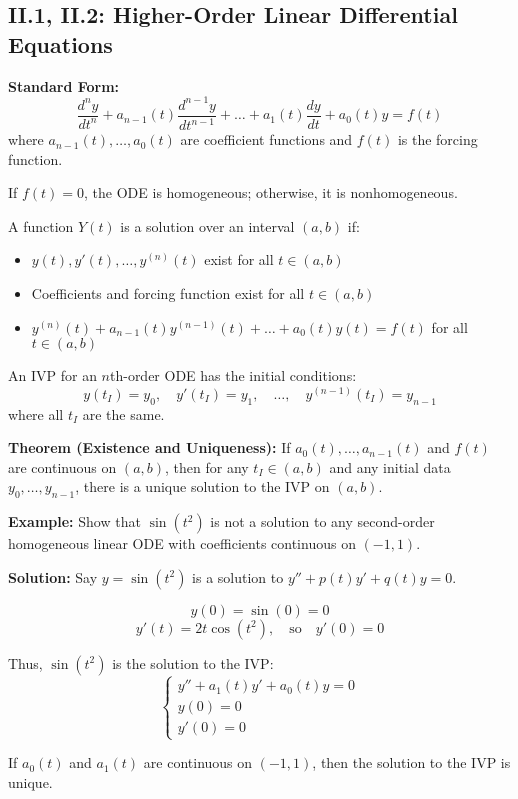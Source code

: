 \documentclass{article}
\begin{document}
\subsection*{II.1, II.2: Higher-Order Linear Differential Equations}

\textbf{Standard Form:}
\[
\frac{d^n y}{dt^n} + a_{n-1}(t) \frac{d^{n-1} y}{dt^{n-1}} + \dots + a_1(t) \frac{dy}{dt} + a_0(t)y = f(t)
\]
where \(a_{n-1}(t), \dots, a_0(t)\) are coefficient functions and \(f(t)\) is the forcing function.

If \(f(t) = 0\), the ODE is homogeneous; otherwise, it is nonhomogeneous.

A function \(Y(t)\) is a solution over an interval \((a, b)\) if:
\begin{itemize}
    \item \(y(t), y'(t), \dots, y^{(n)}(t)\) exist for all \(t \in (a, b)\)
    \item Coefficients and forcing function exist for all \(t \in (a, b)\)
    \item \(y^{(n)}(t) + a_{n-1}(t) y^{(n-1)}(t) + \dots + a_0(t)y(t) = f(t)\) for all \(t \in (a, b)\)
\end{itemize}

An IVP for an \(n\)th-order ODE has the initial conditions:
\[
y(t_I) = y_0, \quad y'(t_I) = y_1, \quad \dots, \quad y^{(n-1)}(t_I) = y_{n-1}
\]
where all \(t_I\) are the same.

\textbf{Theorem (Existence and Uniqueness):}  
If \(a_0(t), \dots, a_{n-1}(t)\) and \(f(t)\) are continuous on \((a, b)\), then for any \(t_I \in (a, b)\) and any initial data \(y_0, \dots, y_{n-1}\), there is a unique solution to the IVP on \((a, b)\).

\textbf{Example:} Show that \(\sin(t^2)\) is not a solution to any second-order homogeneous linear ODE with coefficients continuous on \((-1, 1)\).

\textbf{Solution:}  
Say \(y = \sin(t^2)\) is a solution to \(y'' + p(t)y' + q(t)y = 0\).

\[
y(0) = \sin(0) = 0
\]
\[
y'(t) = 2t \cos(t^2), \quad \text{so} \quad y'(0) = 0
\]

Thus, \(\sin(t^2)\) is the solution to the IVP:
\[
\begin{cases}
y'' + a_1(t)y' + a_0(t)y = 0 \\
y(0) = 0 \\
y'(0) = 0
\end{cases}
\]

If \(a_0(t)\) and \(a_1(t)\) are continuous on \((-1, 1)\), then the solution to the IVP is unique.
\end{document}
